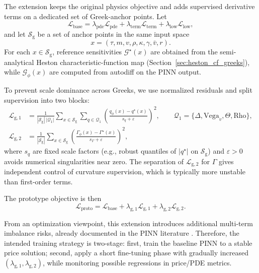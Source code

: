 The extension keeps the original physics objective and adds supervised derivative terms on a dedicated set of Greek-anchor points. Let
\[
\mathcal{L}_{\mathrm{base}}
=
\lambda_{\mathrm{pde}}\mathcal{L}_{\mathrm{pde}}
+\lambda_{\mathrm{term}}\mathcal{L}_{\mathrm{term}}
+\lambda_{\mathrm{low}}\mathcal{L}_{\mathrm{low}},
\]
and let \(\mathcal{S}_{\mathrm{g}}\) be a set of anchor points in the same input space
\[
x=(\tau,m,v,\rho,\kappa,\gamma,\bar v,r).
\]
For each \(x\in\mathcal{S}_{\mathrm{g}}\), reference sensitivities
\(\mathcal{G}^{\star}(x)\) are obtained from the semi-analytical Heston characteristic-function map (Section~\ref{sec:heston_cf_greeks}), while \(\mathcal{G}_{\phi}(x)\) are computed from autodiff on the PINN output.

To prevent scale dominance across Greeks, we use normalized residuals and split supervision into two blocks:
\begin{align}
\mathcal{L}_{\mathrm{g},1}
&=
\frac{1}{|\mathcal{S}_{\mathrm{g}}|\,|\mathcal{Q}_1|}
\sum_{x\in\mathcal{S}_{\mathrm{g}}}
\sum_{q\in\mathcal{Q}_1}
\left(
\frac{q_{\phi}(x)-q^{\star}(x)}{s_q+\varepsilon}
\right)^2,\qquad
\mathcal{Q}_1=\{\Delta,\text{Vega}_{v},\Theta,\text{Rho}\},\\
\mathcal{L}_{\mathrm{g},2}
&=
\frac{1}{|\mathcal{S}_{\mathrm{g}}|}
\sum_{x\in\mathcal{S}_{\mathrm{g}}}
\left(
\frac{\Gamma_{\phi}(x)-\Gamma^{\star}(x)}{s_{\Gamma}+\varepsilon}
\right)^2,
\end{align}
where \(s_q\) are fixed scale factors (e.g., robust quantiles of \(|q^\star|\) on \(\mathcal{S}_{\mathrm{g}}\)) and \(\varepsilon>0\) avoids numerical singularities near zero. The separation of \(\mathcal{L}_{\mathrm{g},2}\) for \(\Gamma\) gives independent control of curvature supervision, which is typically more unstable than first-order terms.

The prototype objective is then
\begin{equation}
\mathcal{L}_{\mathrm{proto}}
=
\mathcal{L}_{\mathrm{base}}
+\lambda_{\mathrm{g},1}\mathcal{L}_{\mathrm{g},1}
+\lambda_{\mathrm{g},2}\mathcal{L}_{\mathrm{g},2}.
\end{equation}

From an optimization viewpoint, this extension introduces additional multi-term imbalance risks, already documented in the PINN literature \cite{wang2021gradientpath,wang2022pinnntk,urban_2025}. Therefore, the intended training strategy is two-stage: first, train the baseline PINN to a stable price solution; second, apply a short fine-tuning phase with gradually increased \((\lambda_{\mathrm{g},1},\lambda_{\mathrm{g},2})\), while monitoring possible regressions in price/PDE metrics.

